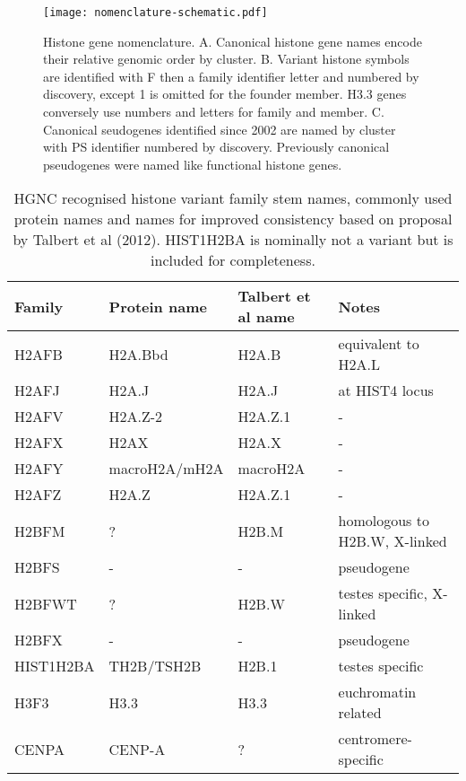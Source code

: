     \begin{figure*}
      \centering
      \texttt{[image: nomenclature-schematic.pdf]}
      \caption{Histone gene nomenclature. 
	  A. Canonical histone gene names encode their relative genomic order by cluster. 
	  B. Variant histone symbols are identified with F then a family identifier letter
	  and numbered by discovery, except 1 is omitted for the founder member.
	  H3.3 genes conversely use numbers and letters for family and member.
	  C. Canonical seudogenes identified since 2002 are named by cluster with PS identifier numbered by discovery. 
	  Previously canonical pseudogenes were named like functional histone genes.}
      \label{fig:nomenclature}
    \end{figure*}

  \begin{table*}
    \caption{HGNC recognised histone variant family stem names, commonly used protein names 
	and names for improved consistency based on proposal by Talbert et al (2012). 
	HIST1H2BA is nominally not a variant but is included for completeness.}
    \label{tab:histone-variant-families}
    \centering
    \begin{tabular}{l l l}
      \toprule
      Family & Protein name & Talbert et al name & Notes \\
      \midrule
	  H2AFB & H2A.Bbd & H2A.B & equivalent to H2A.L \\
	  H2AFJ & H2A.J & H2A.J & at HIST4 locus \\
	  H2AFV & H2A.Z-2 & H2A.Z.1 & - \\
	  H2AFX & H2AX & H2A.X & - \\
	  H2AFY & macroH2A/mH2A & macroH2A & - \\
	  H2AFZ & H2A.Z & H2A.Z.1 & - \\
	  H2BFM & ? & H2B.M & homologous to H2B.W, X-linked\\
	  H2BFS & - & - & pseudogene \\
	  H2BFWT & ? & H2B.W & testes specific, X-linked \\
	  H2BFX & - & - & pseudogene \\
	  HIST1H2BA & TH2B/TSH2B & H2B.1 & testes specific \\
	  H3F3 & H3.3 & H3.3 & euchromatin related \\
	  CENPA & CENP-A & ? & centromere-specific \\
	\bottomrule
    \end{tabular}
  \end{table*}

